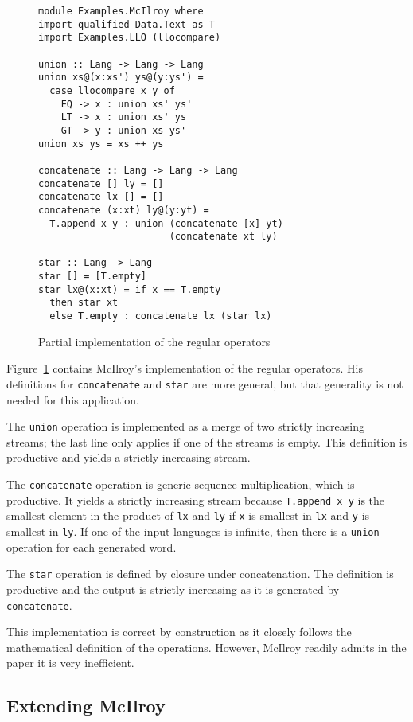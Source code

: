 \begin{figure}[btp]
\begin{lstlisting}
module Examples.McIlroy where
import qualified Data.Text as T
import Examples.LLO (llocompare)

union :: Lang -> Lang -> Lang
union xs@(x:xs') ys@(y:ys') =
  case llocompare x y of
    EQ -> x : union xs' ys'
    LT -> x : union xs' ys
    GT -> y : union xs ys'
union xs ys = xs ++ ys

concatenate :: Lang -> Lang -> Lang
concatenate [] ly = []
concatenate lx [] = []
concatenate (x:xt) ly@(y:yt) =
  T.append x y : union (concatenate [x] yt) 
                       (concatenate xt ly)

star :: Lang -> Lang
star [] = [T.empty]
star lx@(x:xt) = if x == T.empty
  then star xt
  else T.empty : concatenate lx (star lx)
\end{lstlisting}
  \caption{Partial implementation of the regular operators}
  \label{fig:regular-operators-0}
\end{figure}
Figure~\ref{fig:regular-operators-0} contains McIlroy's implementation
of the regular operators. His definitions for \lstinline{concatenate}
and \lstinline{star} are more general, but that generality is not
needed for this application.

The \lstinline{union} operation is
implemented as a merge of two strictly increasing streams; the last
line only applies if one of the streams is empty. This definition is
productive and yields a strictly increasing stream.

The \lstinline{concatenate} operation is generic
sequence multiplication, which is productive. It yields a strictly
increasing stream because \lstinline{T.append x y} is the smallest
element in the product of \lstinline{lx} and \lstinline{ly} if
\lstinline{x} is smallest in \lstinline{lx} and \lstinline{y} is
smallest in \lstinline{ly}. If one of the input languages is infinite, then there is
a \lstinline{union} operation for each generated word.

The \lstinline{star} operation is defined by closure under concatenation. The definition
is productive and the output is strictly increasing as it is generated by
\lstinline{concatenate}.

This implementation is correct by construction as it closely follows the mathematical
definition of the operations. However, McIlroy readily admits in the paper it is very
inefficient.

\subsection{Extending McIlroy}
\label{sec:extending-mcilroy}

